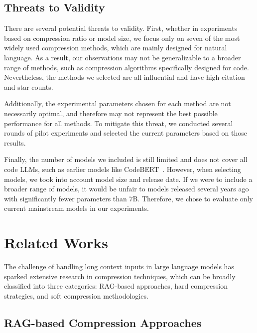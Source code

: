 \subsection{Threats to Validity}
\vspace{-2pt}
There are several potential threats to validity.
First, whether in experiments based on compression ratio or model size, we focus only on seven of the most widely used compression methods, which are mainly designed for natural language. As a result, our observations may not be generalizable to a broader range of methods, such as compression algorithms specifically designed for code. Nevertheless, the methods we selected are all influential and have high citation and star counts.

Additionally, the experimental parameters chosen for each method are not necessarily optimal, and therefore may not represent the best possible performance for all methods. To mitigate this threat, we conducted several rounds of pilot experiments and selected the current parameters based on those results.

Finally, the number of models we included is still limited and does not cover all code LLMs, such as earlier models like CodeBERT~\cite{feng2020codebert}. However, when selecting models, we took into account model size and release date. If we were to include a broader range of models, it would be unfair to models released several years ago with significantly fewer parameters than 7B. Therefore, we chose to evaluate only current mainstream models in our experiments.

\section{Related Works}
\vspace{-2pt}

The challenge of handling long context inputs in large language models has sparked extensive research in compression techniques, which can be broadly classified into three categories: RAG-based approaches, hard compression strategies, and soft compression methodologies.

\subsection{RAG-based Compression Approaches}
\vspace{-2pt}

